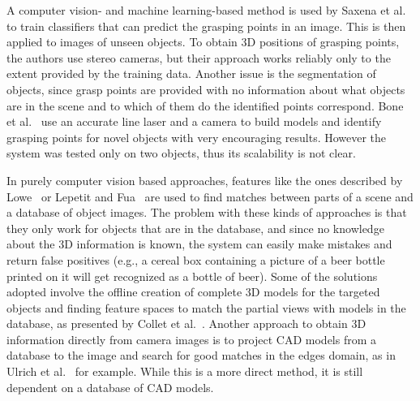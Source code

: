 A computer vision- and machine learning-based method is used by Saxena
et al.~\cite{Saxena08Grasping} to train classifiers that can predict
the grasping points in an image.  This is then applied to images of
unseen objects.  To obtain 3D positions of grasping points, the
authors use stereo cameras, but their approach works reliably only to
the extent provided by the training data.  Another issue is the
segmentation of objects, since grasp points are provided with no
information about what objects are in the scene and to which of them
do the identified points correspond.  Bone et
al.~\cite{Lambert08Grasping} use an accurate line laser and a camera
to build models and identify grasping points for novel objects with
very encouraging results.  However the system was tested only on two
objects, thus its scalability is not clear.

In purely computer vision based approaches, features like the ones described by
Lowe~\cite{lowe04distinctive} or Lepetit and Fua~\cite{lepetit06keypoint} are
used to find matches between parts of a scene and a database of object images.
The problem with these kinds of approaches
is that they only work for objects that are in the database, and since no
knowledge about the 3D information is known, the system can easily make
mistakes and return false positives (e.g., a cereal box containing a picture
of a beer bottle printed on it will get recognized as a bottle of beer).
Some of the solutions adopted involve the offline creation of complete 3D models
for the targeted objects and finding feature spaces to match the partial views
with models in the database, as presented by Collet et al.~\cite{Collet09ICRA}.
Another approach to obtain 3D information directly from camera images is to
project CAD models from a database to the image and search for good matches in
the edges domain, as in Ulrich et al.~\cite{ulrich-etal:09} for example. While
this is a more direct method, it is still dependent on a database of CAD models.


